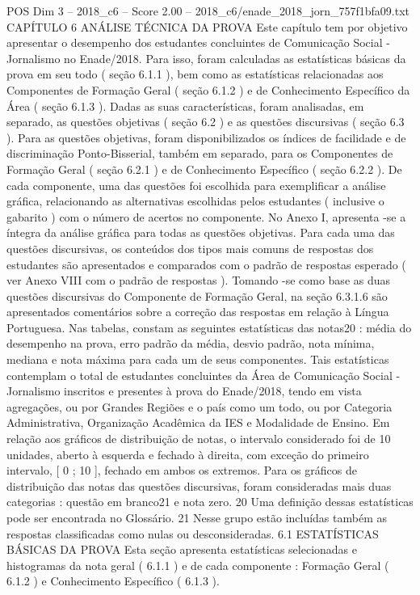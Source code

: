 \begin{textsample}{POS Dim 3 – 2018\_c6 – Score 2.00 – 2018\_c6/enade\_2018\_jorn\_757f1bfa09.txt}  \label{ex:f3_pos_114}
CAPÍTULO 6 ANÁLISE TÉCNICA DA PROVA Este capítulo tem por objetivo apresentar o desempenho dos estudantes concluintes de Comunicação Social - Jornalismo no Enade/2018.
Para isso, foram calculadas as estatísticas básicas da prova em seu todo ( seção 6.1.1 ), bem como as estatísticas relacionadas aos Componentes de Formação Geral ( seção 6.1.2 ) e de Conhecimento Específico da Área ( seção 6.1.3 ).
Dadas as suas características, foram analisadas, em separado, as questões objetivas ( seção 6.2 ) e as questões discursivas ( seção 6.3 ).
Para as questões objetivas, foram disponibilizados os índices de facilidade e de discriminação Ponto-Bisserial, também em separado, para os Componentes de Formação Geral ( seção 6.2.1 ) e de Conhecimento Específico ( seção 6.2.2 ).
De cada componente, uma das questões foi escolhida para exemplificar a análise gráfica, relacionando as alternativas escolhidas pelos estudantes ( inclusive o gabarito ) com o número de acertos no componente.
No Anexo I, apresenta -se a íntegra da análise gráfica para todas as questões objetivas.
Para cada uma das questões discursivas, os conteúdos dos tipos mais comuns de respostas dos estudantes são apresentados e comparados com o padrão de respostas esperado ( ver Anexo VIII com o padrão de respostas ).
Tomando -se como base as duas questões discursivas do Componente de Formação Geral, na seção 6.3.1.6 são apresentados comentários sobre a correção das respostas em relação à Língua Portuguesa.
Nas tabelas, constam as seguintes estatísticas das notas20 : média do desempenho na prova, erro padrão da média, desvio padrão, nota mínima, mediana e nota máxima para cada um de seus componentes.
Tais estatísticas contemplam o total de estudantes concluintes da Área de Comunicação Social - Jornalismo inscritos e presentes à prova do Enade/2018, tendo em vista agregações, ou por Grandes Regiões e o país como um todo, ou por Categoria Administrativa, Organização Acadêmica da IES e Modalidade de Ensino.
Em relação aos gráficos de distribuição de notas, o intervalo considerado foi de 10 unidades, aberto à esquerda e fechado à direita, com exceção do primeiro intervalo, [ 0 ; 10 ], fechado em ambos os extremos.
Para os gráficos de distribuição das notas das questões discursivas, foram consideradas mais duas categorias : questão em branco21 e nota zero. 20 Uma definição dessas estatísticas pode ser encontrada no Glossário. 21 Nesse grupo estão incluídas também as respostas classificadas como nulas ou desconsideradas. 6.1 ESTATÍSTICAS BÁSICAS DA PROVA Esta seção apresenta estatísticas selecionadas e histogramas da nota geral ( 6.1.1 ) e de cada componente : Formação Geral ( 6.1.2 ) e Conhecimento Específico ( 6.1.3 ).

\end{textsample}
